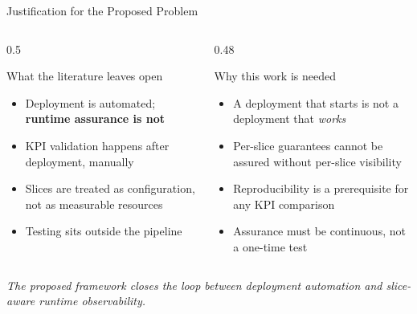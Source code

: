 \documentclass[aspectratio=169,11pt]{beamer}
\begin{document}
\begin{frame}{Justification for the Proposed Problem}
  \begin{columns}[T,onlytextwidth]
    \begin{column}{0.5\textwidth}
      \begin{block}{What the literature leaves open}
        \small
        \begin{itemize}
          \item Deployment is automated; \textbf{runtime assurance is not}
          \item KPI validation happens after deployment, manually
          \item Slices are treated as configuration, not as measurable resources
          \item Testing sits outside the pipeline
        \end{itemize}
      \end{block}
    \end{column}
    \begin{column}{0.48\textwidth}
      \begin{block}{Why this work is needed}
        \small
        \begin{itemize}
          \item A deployment that starts is not a deployment that \emph{works}
          \item Per-slice guarantees cannot be assured without per-slice visibility
          \item Reproducibility is a prerequisite for any KPI comparison
          \item Assurance must be continuous, not a one-time test
        \end{itemize}
      \end{block}
    \end{column}
  \end{columns}
  \vfill
  \begin{center}
    \small\itshape
    The proposed framework closes the loop between deployment automation and
    slice-aware runtime observability.
  \end{center}
\end{frame}
\end{document}
